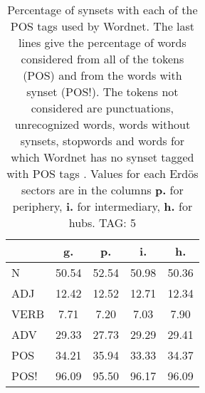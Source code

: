 \begin{table}[h!]
\begin{center}
\begin{tabular}{| l || c | c | c | c |}\hline
 & {\bf g.} & {\bf p.} & {\bf i.} & {\bf h.} \\\hline\hline
N & 50.54  & 52.54  & 50.98  & 50.36 \\\hline
ADJ & 12.42  & 12.52  & 12.71  & 12.34 \\\hline
VERB & 7.71  & 7.20  & 7.03  & 7.90 \\\hline
ADV & 29.33  & 27.73  & 29.29  & 29.41 \\\hline\hline
POS & 34.21  & 35.94  & 33.33  & 34.37 \\\hline
POS! & 96.09  & 95.50  & 96.17  & 96.09 \\\hline
\end{tabular}
\caption{Percentage of synsets with each of the POS tags used by Wordnet. The last lines give the percentage of words considered from all of the tokens (POS) and from the words with synset (POS!). The tokens not considered are punctuations, unrecognized words, words without synsets, stopwords and words for which Wordnet has no synset  tagged with POS tags . Values for each Erd\"os sectors are in the columns {{\bf p.}} for periphery, {{\bf i.}} for intermediary, {{\bf h.}} for hubs. TAG: 5}
\end{center}
\end{table}